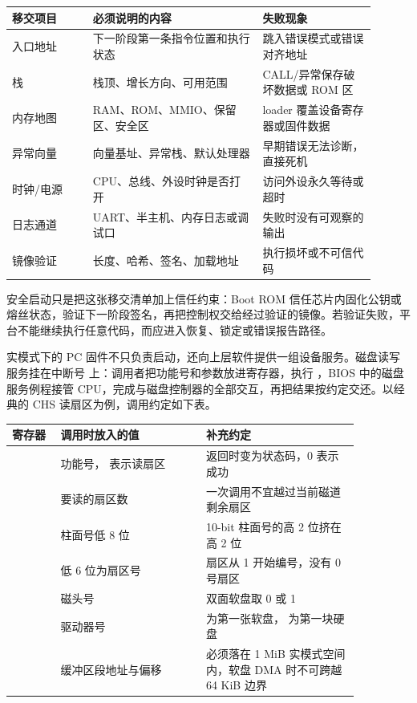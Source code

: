 \begin{longtable}{L{0.2\linewidth}L{0.42\linewidth}L{0.28\linewidth}}
\toprule
移交项目 & 必须说明的内容 & 失败现象 \\
\midrule
入口地址 & 下一阶段第一条指令位置和执行状态 & 跳入错误模式或错误对齐地址 \\\tablerowrule
栈 & 栈顶、增长方向、可用范围 & CALL/异常保存破坏数据或 ROM 区 \\\tablerowrule
内存地图 & RAM、ROM、MMIO、保留区、安全区 & loader 覆盖设备寄存器或固件数据 \\\tablerowrule
异常向量 & 向量基址、异常栈、默认处理器 & 早期错误无法诊断，直接死机 \\\tablerowrule
时钟/电源 & CPU、总线、外设时钟是否打开 & 访问外设永久等待或超时 \\\tablerowrule
日志通道 & UART、半主机、内存日志或调试口 & 失败时没有可观察的输出 \\\tablerowrule
镜像验证 & 长度、哈希、签名、加载地址 & 执行损坏或不可信代码 \\
\bottomrule
\end{longtable}

安全启动只是把这张移交清单加上信任约束：Boot ROM 信任芯片内固化公钥或熔丝状态，验证下一阶段签名，再把控制权交给经过验证的镜像。若验证失败，平台不能继续执行任意代码，而应进入恢复、锁定或错误报告路径。

实模式下的 PC 固件不只负责启动，还向上层软件提供一组设备服务。磁盘读写服务挂在中断号  上：调用者把功能号和参数放进寄存器，执行 ，BIOS 中的磁盘服务例程接管 CPU，完成与磁盘控制器的全部交互，再把结果按约定交还。以经典的 CHS 读扇区为例，调用约定如下表。

\begin{longtable}{L{0.12\linewidth}L{0.36\linewidth}L{0.38\linewidth}}
\toprule
寄存器 & 调用时放入的值 & 补充约定 \\
\midrule
{} & 功能号， 表示读扇区 & 返回时变为状态码，0 表示成功 \\\tablerowrule
{} & 要读的扇区数 & 一次调用不宜越过当前磁道剩余扇区 \\\tablerowrule
{} & 柱面号低 8 位 & 10-bit 柱面号的高 2 位挤在  高 2 位 \\\tablerowrule
{} & 低 6 位为扇区号 & 扇区从 1 开始编号，没有 0 号扇区 \\\tablerowrule
{} & 磁头号 & 双面软盘取 0 或 1 \\\tablerowrule
{} & 驱动器号 &  为第一张软盘， 为第一块硬盘 \\\tablerowrule
{} & 缓冲区段地址与偏移 & 必须落在 1 MiB 实模式空间内，软盘 DMA 时不可跨越 64 KiB 边界 \\
\bottomrule
\end{longtable}

